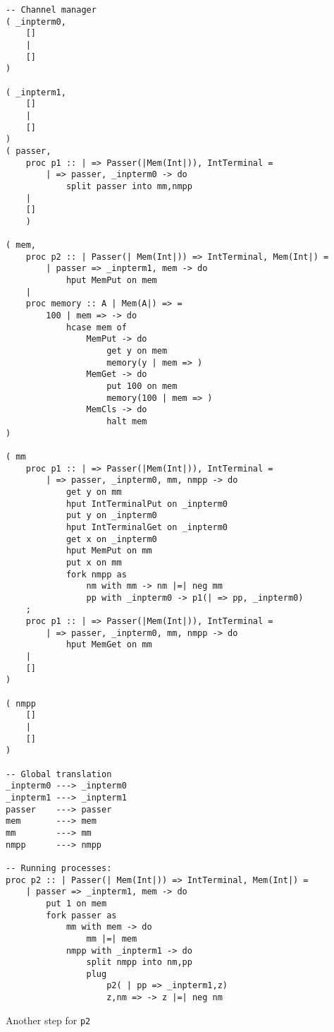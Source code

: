 \documentclass{article}
\theoremstyle{plain}%
\theoremstyle{definition}
\theoremstyle{remark}
\begin{document}
\begin{verbatim}
-- Channel manager
( _inpterm0,  
    []
    |
    []
)

( _inpterm1,  
    []
    |
    []
)
( passer,
    proc p1 :: | => Passer(|Mem(Int|)), IntTerminal = 
        | => passer, _inpterm0 -> do
            split passer into mm,nmpp 
    |
    []
    )

( mem,
    proc p2 :: | Passer(| Mem(Int|)) => IntTerminal, Mem(Int|) =
        | passer => _inpterm1, mem -> do
            hput MemPut on mem
    |
    proc memory :: A | Mem(A|) => =
        100 | mem => -> do
            hcase mem of
                MemPut -> do
                    get y on mem
                    memory(y | mem => )
                MemGet -> do
                    put 100 on mem
                    memory(100 | mem => )
                MemCls -> do
                    halt mem
)

( mm
    proc p1 :: | => Passer(|Mem(Int|)), IntTerminal = 
        | => passer, _inpterm0, mm, nmpp -> do
            get y on mm
            hput IntTerminalPut on _inpterm0
            put y on _inpterm0
            hput IntTerminalGet on _inpterm0
            get x on _inpterm0
            hput MemPut on mm
            put x on mm
            fork nmpp as
                nm with mm -> nm |=| neg mm
                pp with _inpterm0 -> p1(| => pp, _inpterm0)
    ;
    proc p1 :: | => Passer(|Mem(Int|)), IntTerminal = 
        | => passer, _inpterm0, mm, nmpp -> do
            hput MemGet on mm 
    |
    []
)

( nmpp
    []
    |
    []
)

-- Global translation
_inpterm0 ---> _inpterm0 
_inpterm1 ---> _inpterm1 
passer    ---> passer 
mem       ---> mem
mm        ---> mm
nmpp      ---> nmpp

-- Running processes:
proc p2 :: | Passer(| Mem(Int|)) => IntTerminal, Mem(Int|) =
    | passer => _inpterm1, mem -> do
        put 1 on mem
        fork passer as
            mm with mem -> do
                mm |=| mem
            nmpp with _inpterm1 -> do
                split nmpp into nm,pp
                plug
                    p2( | pp => _inpterm1,z)
                    z,nm => -> z |=| neg nm
\end{verbatim}
Another step for \verb|p2|
\end{document}
